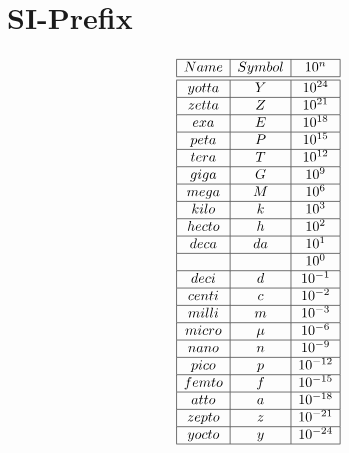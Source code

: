 \chapter{SI-Prefix}

\[
\begin{array}{|c|c|c|}
\firsthline
Name    & Symbol & 10^{n}  \\
\hline
\hline
yotta 	& Y	& 10^{24}	 \\ \hline
zetta	& Z	& 10^{21}	 \\ \hline
exa	& E	& 10^{18}	 \\ \hline
peta	& P	& 10^{15}	 \\ \hline
tera	& T	& 10^{12}	 \\ \hline
giga	& G	& 10^{9}	 \\ \hline
mega	& M	& 10^{6}	 \\ \hline
kilo	& k	& 10^{3}	 \\ \hline
hecto	& h	& 10^{2}	 \\ \hline
deca	& da	& 10^{1}	 \\ \hline
	&    	& 10^{0}	 \\ \hline
deci	& d  	& 10^{-1}	 \\ \hline
centi	& c  	& 10^{-2}	 \\ \hline
milli	& m  	& 10^{-3}	 \\ \hline
micro	& \mu 	& 10^{-6}	 \\ \hline
nano	& n	& 10^{-9} 	 \\ \hline
pico	& p	& 10^{-12}	 \\ \hline
femto	& f	& 10^{-15}	 \\ \hline
atto	& a	& 10^{-18}	 \\ \hline
zepto	& z	& 10^{-21}	 \\ \hline
yocto	& y	& 10^{-24}	 \\ \hline
\end{array}
\]
